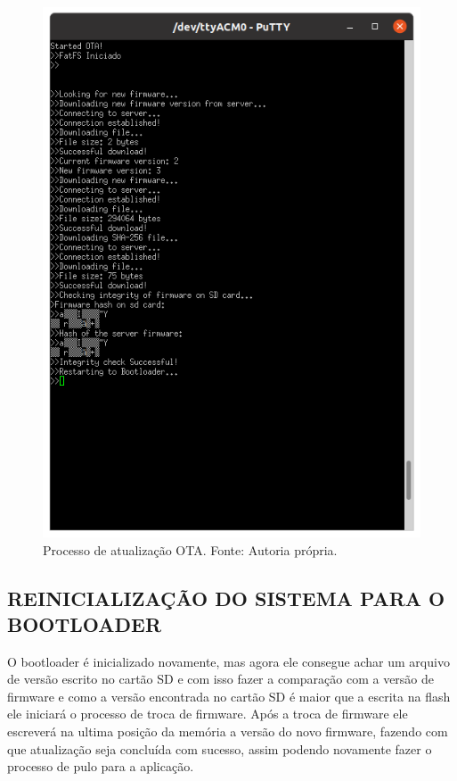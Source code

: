 \begin{figure}[H]
    \scriptsize
     \centering
     \includegraphics[scale=0.7]{dados/figuras/atualizaçãoOTAcompleto.png}
     \caption{Processo de atualização OTA. \newline Fonte: Autoria própria.}
     \label{processoOTA}
\end{figure}

\subsection{REINICIALIZAÇÃO DO SISTEMA PARA O BOOTLOADER}
O bootloader é inicializado novamente, mas agora ele consegue achar um arquivo de versão escrito no cartão SD e com isso fazer a comparação com a versão de firmware e como a versão encontrada no cartão SD é maior que a escrita na flash ele iniciará o processo de troca de firmware.
Após a troca de firmware ele escreverá na ultima posição da memória a versão do novo firmware, fazendo com que atualização seja concluída com sucesso, assim podendo novamente fazer o processo de pulo para a aplicação.
